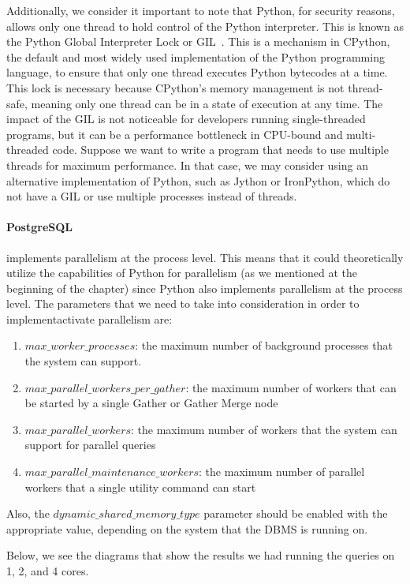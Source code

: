 Additionally, we consider it important to note that Python, for security reasons, allows only one thread to hold control of the Python interpreter. 
This is known as the Python Global Interpreter Lock or GIL~\cite{PythonGIL}. This is a mechanism in CPython, 
the default and most widely used implementation of the 
Python programming language, to ensure that only one thread executes Python bytecodes at a time. 
This lock is necessary because CPython's memory management is not thread-safe, meaning only one thread can be in a state of execution at any time. 
The impact of the GIL is not noticeable for developers running single-threaded programs, 
but it can be a performance bottleneck in CPU-bound and multi-threaded code. Suppose we want to write a program that needs to use multiple threads 
for maximum performance. In that case, we may consider using an alternative implementation of Python, such as Jython or IronPython, 
which do not have a GIL or use multiple processes instead of threads.

\paragraph{PostgreSQL} implements parallelism at the process level. 
This means that it could theoretically utilize the capabilities of Python 
for parallelism (as we mentioned at the beginning of the chapter) 
since Python also implements parallelism at the process level. The
parameters that we need to take into consideration in order to 
implement\/activate parallelism are:
\begin{enumerate}
	\item $max\_worker\_processes$: the maximum number of background 
	processes that the system can support.
	\item $max\_parallel\_workers\_per\_gather$: the maximum number of 
	workers that can be started by a single Gather or Gather Merge node
	\item $max\_parallel\_workers$: the maximum number of workers that the 
	system can support for parallel queries
	\item $max\_parallel\_maintenance\_workers$: the maximum number of 
	parallel workers that a single utility command can start
\end{enumerate}
Also, the $dynamic\_shared\_memory\_type$ parameter should be enabled with
the appropriate value, depending on the system that the DBMS is running on.

Below, we see the diagrams that show the results we had running the queries 
on 1, 2, and 4 cores.

